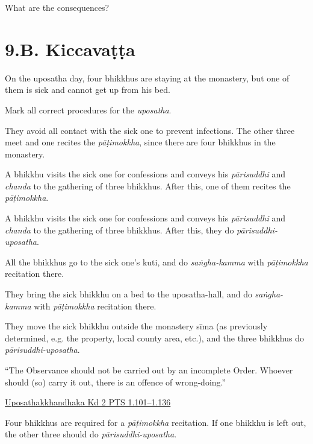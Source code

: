 What are the consequences?

\chapter{9.B. Kiccavaṭṭa}
\renewcommand*{\theChapterTitle}{9.B. Kiccavaṭṭa}

\begin{exam}{\autoExamName}

\begin{problem}

  On the uposatha day, four bhikkhus are staying at the monastery, but one of
  them is sick and cannot get up from his bed.

  Mark all correct procedures for the \emph{uposatha}.

  \bigskip

  \begin{manswers}{1}
    \bChoices

     They avoid all contact with the sick one to prevent infections. The
    other three meet and one recites the \emph{pāṭimokkha}, since there are four
    bhikkhus in the monastery.\eAns

     A bhikkhu visits the sick one for confessions and conveys his
    \emph{pārisuddhi} and \emph{chanda} to the gathering of three bhikkhus.
    After this, one of them recites the \emph{pāṭimokkha}.\eAns

     A bhikkhu visits the sick one for confessions and conveys his
    \emph{pārisuddhi} and \emph{chanda} to the gathering of three bhikkhus.
    After this, they do \emph{pārisuddhi-uposatha}.\eAns

     All the bhikkhus go to the sick one's kuti, and do \emph{saṅgha-kamma}
    with \emph{pāṭimokkha} recitation there.\eAns

     They bring the sick bhikkhu on a bed to the uposatha-hall, and do
    \emph{saṅgha-kamma} with \emph{pāṭimokkha} recitation there.\eAns

     They move the sick bhikkhu outside the monastery sīma (as previously
    determined, e.g. the property, local county area, etc.), and the three
    bhikkhus do \emph{pārisuddhi-uposatha}.\eAns

    \eChoices
  \end{manswers}

  \begin{solution}

    ``The Observance should not be carried out by an incomplete Order. Whoever
    should (so) carry it out, there is an offence of wrong-doing.''

    \href{https://suttacentral.net/pli-tv-kd2/en/horner-brahmali}{Uposathakkhandhaka Kd 2 PTS 1.101–1.136}

    Four bhikkhus are required for a \emph{pāṭimokkha} recitation. If one
    bhikkhu is left out, the other three should do \emph{pārisuddhi-uposatha}.

  \end{solution}

\end{problem}


\end{exam}
